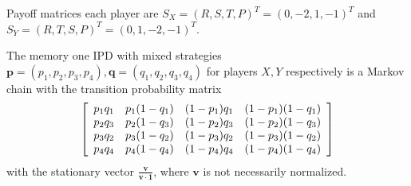 Payoff matrices each player are $S_X = (R, S, T, P)^T = (0, -2, 1, -1)^T$ and $S_Y = (R, T, S, P)^T = (0, 1, -2, -1)^T$.

The memory one IPD with mixed strategies $\mathbf{p} = (p_1, p_2, p_3, p_4), \mathbf{q} = (q_1, q_2, q_3, q_4)$ for players $X, Y$ respectively is a Markov chain with the transition probability matrix
\[
\left[
\begin{array}{c c c c}
p_1q_1 & p_1 (1-q_1) & (1-p_1)q_1 & (1-p_1)(1-q_1) \\
p_2q_3 & p_2 (1-q_3) & (1-p_2)q_3 & (1-p_2)(1-q_3) \\
p_3q_2 & p_3 (1-q_2) & (1-p_3)q_2 & (1-p_3)(1-q_2) \\
p_4q_4 & p_4 (1-q_4) & (1-p_4)q_4 & (1-p_4)(1-q_4)
\end{array}
\right]
\]
with the stationary vector $\frac{\mathbf{v}}{\mathbf{v} \cdot \mathbf{1}}$, where $\mathbf{v}$ is not necessarily normalized.

